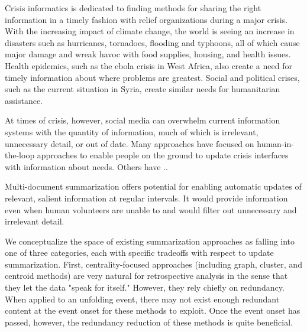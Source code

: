 

Crisis informatics\cite{?} is dedicated to finding methods for sharing the
right information in a timely fashion with relief organizations during a major crisis. With the
increasing impact of climate change, the world is seeing an increase in
disasters such as hurricanes, tornadoes, flooding and typhoons, all of which
cause major damage and wreak havoc with food supplies, housing, and health
issues. Health epidemics, such as the ebola crisis in West Africa, also create
a need for timely information about where problems are greatest. Social and
political 
crises, such as the current situation in Syria, create similar needs for
humanitarian assistance.

At times of crisis, however, social media can overwhelm current information
systems with the quantity of information, much of which is irrelevant,
unnecessary detail, or out of date. Many approaches have focused on
human-in-the-loop approaches \cite{?} to enable people on the ground to update
crisis interfaces with information about needs. Others have ..




Multi-document summarization offers potential for enabling automatic updates of
relevant, salient information at regular intervals. It would provide
information even when human volunteers are unable to and would filter out
unnecessary and irrelevant detail. 

We conceptualize the space of existing summarization approaches as falling into
one of three categories, each with specific tradeoffs with respect to update 
summarization. First, centrality-focused approaches (including graph,
cluster, and centroid methods) are very natural for retrospective analysis in
the sense that they let the data "speak for itself." However, they rely
chiefly on
redundancy. When applied to an unfolding event, there may not exist enough
redundant content at the event onset for these methods to exploit.
Once the event onset has passed, however, the redundancy reduction of these 
methods is quite beneficial.

